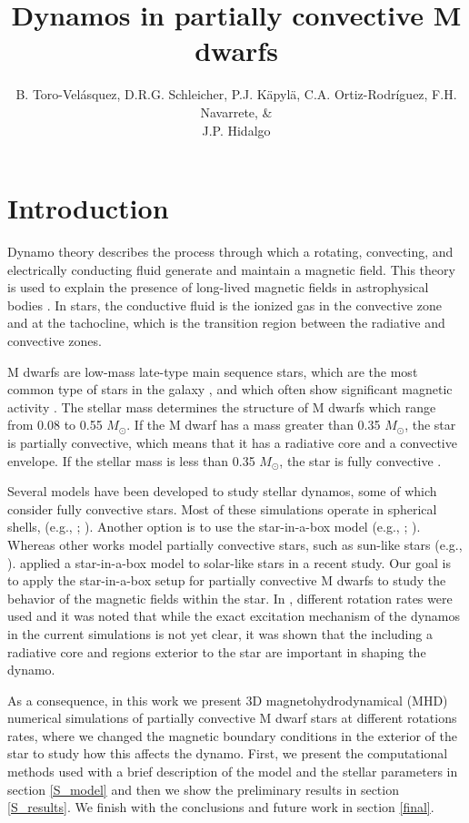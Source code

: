 \documentclass[baaa]{baaa}
\title{Dynamos in partially convective M dwarfs}
\author{
B. Toro-Velásquez\inst{1},
D.R.G. Schleicher\inst{1},
P.J. Käpylä\inst{2}, 
C.A. Ortiz-Rodríguez\inst{3},
F.H. Navarrete\inst{4},
\& \\
J.P. Hidalgo\inst{1} 
}
\institute{
Departamento de Astronomía, Universidad de Concepción, Chile
\and
Institut für Sonnenphysik, KIS, Alemania
\and
Hamburger Sternwarte, Universität Hamburg, Alemania
\and
Institute of Space Sciences, ICE--CSIC, España
}
\begin{document}
\maketitle %
\section{Introduction}\label{S_intro}


Dynamo theory describes the process through which a rotating, convecting, and electrically conducting fluid generate and maintain a magnetic field. This theory is used to explain the presence of long-lived magnetic fields in astrophysical bodies \citep{dyntheo}. In stars, the conductive fluid is the ionized gas in the convective zone and at the tachocline, which is the transition region between the radiative and convective zones.

M dwarfs are low-mass late-type main sequence stars, which are the most common type of stars in the galaxy \citep{comunes}, and which often show significant magnetic activity \citep{mfmd}. The stellar mass determines the structure of M dwarfs which range from 0.08 to 0.55 $M_{\odot}$. If the M dwarf has a mass greater than 0.35 $M_{\odot}$, the star is partially convective, which means that it has a radiative core and a convective envelope. If the stellar mass is less than 0.35 $M_{\odot}$, the star is fully convective \citep{estructure}.

Several models have been developed to study stellar dynamos, some of which consider fully convective stars. Most of these simulations operate in spherical shells, (e.g., \citealt{brown}; \citealt{paper2016}). Another option is to use the star-in-a-box model (e.g., \citealt{caroo}; \citealt{model}). Whereas other works model partially convective stars, such as sun-like stars (e.g., \citealt{Felipe1, Felipe2}). \cite{petriSL} applied a star-in-a-box model to solar-like stars in a recent study. Our goal is to apply the star-in-a-box setup for partially convective M dwarfs to study the behavior of the magnetic fields within the star. In \cite{petriSL}, different rotation rates were used and it was noted that while the exact excitation mechanism of the dynamos in the current simulations is not yet clear, it was shown that the including a radiative core and regions exterior to the star are important in shaping the dynamo. 

As a consequence, in this work we present 3D magnetohydrodynamical (MHD) numerical simulations of partially convective M dwarf stars at different rotations rates, where we changed the magnetic boundary conditions in the exterior of the star to study how this affects the dynamo. First, we present the computational methods used with a brief description of the model and the stellar parameters in section \ref{S_model} and then we show the preliminary results in section \ref{S_results}. We finish with the conclusions and future work in section \ref{final}.
\vfill
\end{document}
